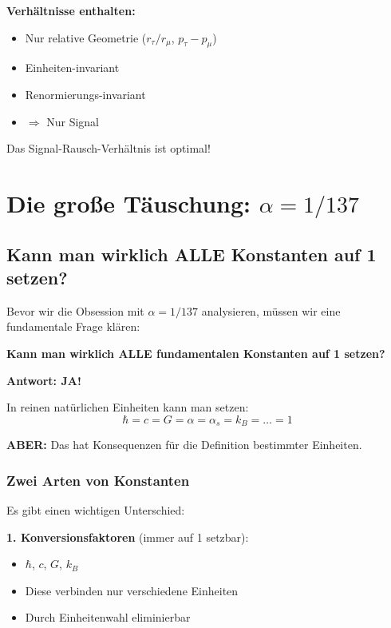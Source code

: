 \textbf{Verhältnisse enthalten:}
\begin{itemize}[nosep]
	\item Nur relative Geometrie ($r_\tau/r_\mu$, $p_\tau - p_\mu$)
	\item Einheiten-invariant
	\item Renormierungs-invariant
	\item $\Rightarrow$ Nur Signal
\end{itemize}

Das Signal-Rausch-Verhältnis ist optimal!

\section{Die große Täuschung: $\alpha = 1/137$}

\subsection{Kann man wirklich ALLE Konstanten auf 1 setzen?}

Bevor wir die Obsession mit $\alpha = 1/137$ analysieren, müssen wir eine fundamentale Frage klären:

\begin{important}
	\textbf{Kann man wirklich ALLE fundamentalen Konstanten auf 1 setzen?}
	
	\textbf{Antwort: JA!}
	
	In reinen natürlichen Einheiten kann man setzen:
	\begin{equation}
		\hbar = c = G = \alpha = \alpha_s = k_B = \ldots = 1
	\end{equation}
	
	\textbf{ABER:} Das hat Konsequenzen für die Definition bestimmter Einheiten.
\end{important}

\subsubsection{Zwei Arten von Konstanten}

Es gibt einen wichtigen Unterschied:

\textbf{1. Konversionsfaktoren} (immer auf 1 setzbar):
\begin{itemize}[nosep]
	\item $\hbar$, $c$, $G$, $k_B$
	\item Diese verbinden nur verschiedene Einheiten
	\item Durch Einheitenwahl eliminierbar
\end{itemize}

